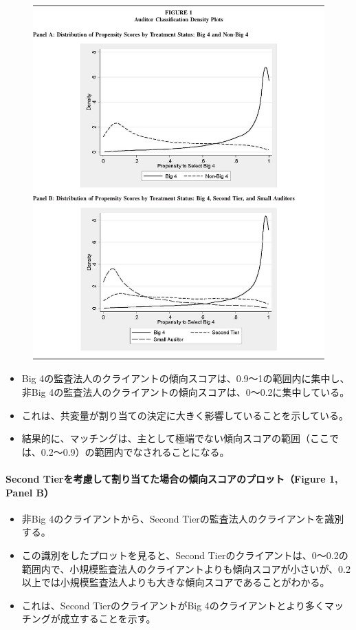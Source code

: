 \begin{figure}
 \centering
 \includegraphics[width=16cm]{../fig/fig01.pdf}
\end{figure}

\begin{itemize}
 \item Big 4の監査法人のクライアントの傾向スコアは、0.9〜1の範囲内に集中し、非Big 4の監査法人のクライアントの傾向スコアは、0〜0.2に集中している。
 \item これは、共変量が割り当ての決定に大きく影響していることを示している。
 \item 結果的に、マッチングは、主として極端でない傾向スコアの範囲（ここでは、0.2〜0.9）の範囲内でなされることになる。
\end{itemize}

\paragraph{Second Tierを考慮して割り当てた場合の傾向スコアのプロット（Figure 1, Panel B）}

\begin{itemize}
 \item 非Big 4のクライアントから、Second Tierの監査法人のクライアントを識別する。
 \item この識別をしたプロットを見ると、Second Tierのクライアントは、0〜0.2の範囲内で、小規模監査法人のクライアントよりも傾向スコアが小さいが、0.2以上では小規模監査法人よりも大きな傾向スコアであることがわかる。
 \item これは、Second TierのクライアントがBig 4のクライアントとより多くマッチングが成立することを示す。
\end{itemize}

